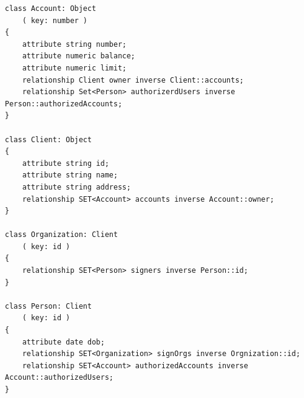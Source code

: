 \documentclass[11pt]{article}
\begin{document}
\begin{verbatim}
class Account: Object
    ( key: number )
{
    attribute string number;
    attribute numeric balance;
    attribute numeric limit;
    relationship Client owner inverse Client::accounts;
    relationship Set<Person> authorizerdUsers inverse Person::authorizedAccounts;
}

class Client: Object
{
    attribute string id;
    attribute string name;
    attribute string address;
    relationship SET<Account> accounts inverse Account::owner;
}

class Organization: Client
    ( key: id )
{
    relationship SET<Person> signers inverse Person::id;
}

class Person: Client
    ( key: id )
{
    attribute date dob;
    relationship SET<Organization> signOrgs inverse Orgnization::id;
    relationship SET<Account> authorizedAccounts inverse Account::authorizedUsers;
}
\end{verbatim}
\end{document}
